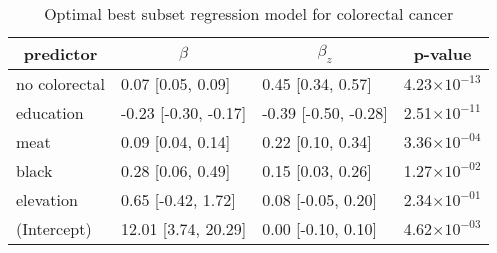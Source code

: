 %
\begin{table}[!tbp]
\caption{Optimal best subset regression model for colorectal cancer\label{SI_tab:colorectal}} 
\begin{center}
\begin{tabular}{llll}
\hline\hline
\multicolumn{1}{c}{predictor}&\multicolumn{1}{c}{$\beta$}&\multicolumn{1}{c}{$\beta_z$}&\multicolumn{1}{c}{p-value}\tabularnewline
\hline
no colorectal&0.07 [0.05, 0.09]&0.45 [0.34, 0.57]&4.23$\times10^{-13}$\tabularnewline
education&-0.23 [-0.30, -0.17]&-0.39 [-0.50, -0.28]&2.51$\times10^{-11}$\tabularnewline
meat&0.09 [0.04, 0.14]&0.22 [0.10, 0.34]&3.36$\times10^{-04}$\tabularnewline
black&0.28 [0.06, 0.49]&0.15 [0.03, 0.26]&1.27$\times10^{-02}$\tabularnewline
elevation&0.65 [-0.42, 1.72]&0.08 [-0.05, 0.20]&2.34$\times10^{-01}$\tabularnewline
(Intercept)&12.01 [3.74, 20.29]&0.00 [-0.10, 0.10]&4.62$\times10^{-03}$\tabularnewline
\hline
\end{tabular}
\end{center}
\end{table}

